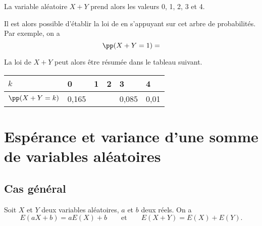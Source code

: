 \documentclass[11pt,fleqn, openany]{book} %
\begin{document}
\begin{example}
\begin{center}
\end{center}

La variable aléatoire $X+Y$ prend alors les valeurs 0, 1, 2, 3 et 4.

Il est alors possible d'établir la loi de  en s'appuyant sur cet arbre de probabilités. Par exemple, on a
\[\pp(X+Y=1)=\]

La loi de $X+Y$ peut alors être résumée dans le tableau suivant.

\renewcommand{\arraystretch}{1.5}
\begin{center}
\begin{tabularx}{0.7\linewidth}{|l|X|X|X|X|X|}
\hline
$k$ & 0 & 1 & 2 & 3 & 4 \\
\hline
$\pp(X+Y=k)$ & 0,165 &  &  & 0,085&0,01 \\
\hline
\end{tabularx}

\end{center}
\vspace{-0,5cm}
\end{example}


\vspace{-1cm}
\section{Espérance et variance d'une somme de variables aléatoires}

\subsection{Cas général}

\begin{proposition}Soit $X$ et $Y$ deux variables aléatoires, $a$ et $b$ deux réels. On a
\[E(aX+b)=aE(X) + b \qquad \text{et} \qquad E(X+Y)=E(X)+ E(Y).\]
\vspace{-0,5cm}\end{proposition}
\end{document}
